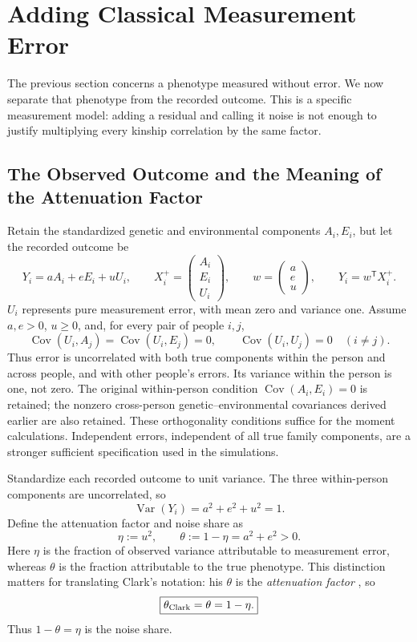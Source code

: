 \section{Adding Classical Measurement Error}
\label{sec:measurement-error}

The previous section concerns a phenotype measured without error. We now
separate that phenotype from the recorded outcome. This is a specific
measurement model: adding a residual and calling it noise is not enough
to justify multiplying every kinship correlation by the same factor.

\subsection{The Observed Outcome and the Meaning of the Attenuation Factor}

Retain the standardized genetic and environmental components $A_i,E_i$,
but let the recorded outcome be
\begin{equation}
 Y_i=aA_i+eE_i+uU_i,\qquad
 X_i^+=\begin{pmatrix}A_i\\E_i\\U_i\end{pmatrix},\qquad
 w=\begin{pmatrix}a\\e\\u\end{pmatrix},\qquad Y_i=w^{\mathsf T}X_i^+.
 \label{eq:me-outcome}
\end{equation}
$U_i$ represents pure measurement error, with mean zero and variance
one. Assume $a,e>0$, $u\geq0$, and, for every pair of people $i,j$,
\begin{equation}
 \operatorname{Cov}(U_i,A_j)=\operatorname{Cov}(U_i,E_j)=0,\qquad
 \operatorname{Cov}(U_i,U_j)=0\quad(i\ne j).
 \label{eq:me-orthogonality}
\end{equation}
Thus error is uncorrelated with both true components within the person
and across people, and with other people's errors. Its variance within
the person is one, not zero. The original within-person condition
$\operatorname{Cov}(A_i,E_i)=0$ is retained; the nonzero cross-person
genetic--environmental covariances derived earlier are also retained.
These orthogonality conditions suffice for the moment calculations.
Independent errors, independent of all true family components, are a
stronger sufficient specification used in the simulations.

Standardize each recorded outcome to unit variance. The three
within-person components are uncorrelated, so
\[
 \operatorname{Var}(Y_i)=a^2+e^2+u^2=1.
\]
Define the attenuation factor and noise share as
\begin{equation}
 \eta:=u^2,\qquad
 \theta:=1-\eta=a^2+e^2>0.
 \label{eq:me-shares}
\end{equation}
Here $\eta$ is the fraction of observed variance attributable to
measurement error, whereas $\theta$ is the fraction attributable to
the true phenotype. This distinction matters for translating Clark's
notation: his $\theta$ is the \emph{attenuation factor}
\citep[p.~42 and Table~A1]{Clark2026}, so
\[
 \boxed{\theta_{\rm Clark}=\theta=1-\eta.}
\]
Thus $1-\theta=\eta$ is the noise share.

